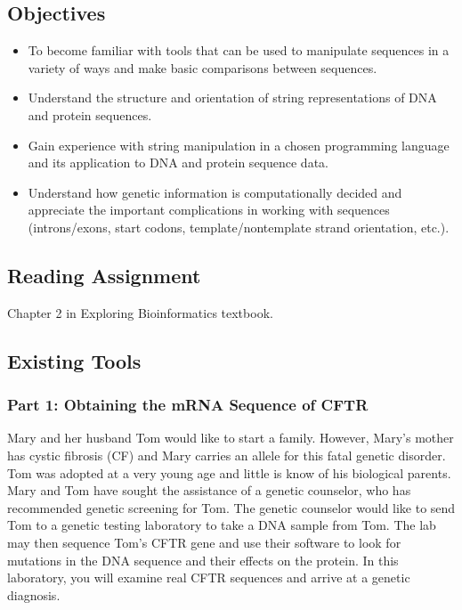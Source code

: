 

\long{}



\vspace*{-.1in}
\subsection*{Objectives}
\vspace*{-.1in}

\begin{itemize}
	\item To become familiar with tools that can be used to manipulate sequences in a variety of ways and make basic comparisons between sequences.
	\item Understand the structure and orientation of string representations of DNA and protein sequences.
	\item Gain experience with string manipulation in a chosen programming language and its application to DNA and protein sequence data.
	\item Understand how genetic information is computationally decided and appreciate the important complications in working with sequences (introns/exons, start codons, template/nontemplate strand orientation, etc.).
\end{itemize}

\vspace*{-.1in}
\subsection*{Reading Assignment}
\vspace*{-.1in}
Chapter 2 in Exploring Bioinformatics textbook.

\vspace*{-.1in}
\subsection*{Existing Tools}
\vspace*{-.1in} 

\subsubsection*{Part 1: Obtaining the mRNA Sequence of CFTR}
Mary and her husband Tom would like to start a family.  However, Mary's mother has cystic fibrosis (CF) and Mary carries an allele for this fatal genetic disorder.  Tom was adopted at a very young age and little is know of his biological parents.  Mary and Tom have sought the assistance of a genetic counselor, who has recommended genetic screening for Tom.  The genetic counselor would like to send Tom to a genetic testing laboratory to take a DNA sample from Tom.  The lab may then sequence Tom's CFTR gene and use their software to look for mutations in the DNA sequence and their effects on the protein.  In this laboratory, you will examine real CFTR sequences and arrive at a genetic diagnosis.

